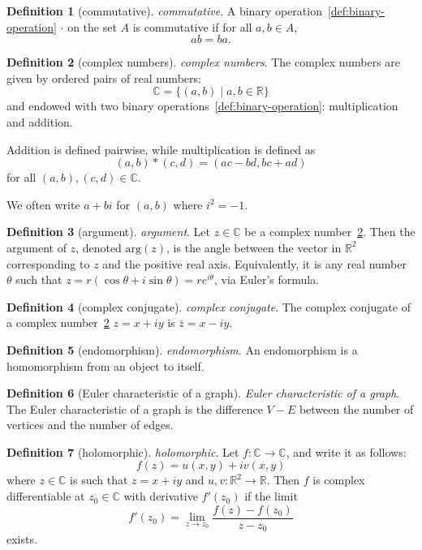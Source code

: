 \documentclass[12pt,a4paper]{article}
\theoremstyle{definition}
\newtheorem{definition}{Definition}
\begin{document}
\begin{definition}[commutative]\label{def:commutative}
\emph{commutative}. A binary operation~\ref{def:binary-operation} $\cdot$ on the set $A$ is commutative if for all $a,b\in A$, $$ab = ba.$$
\end{definition}

\begin{definition}[complex numbers]\label{def:complex-numbers}
\emph{complex numbers}. The complex numbers are given by ordered pairs of real numbers: $$\mathbb C = \{(a,b)\mid a,b\in \mathbb R\}$$ and endowed with two binary operations~\ref{def:binary-operation}: multiplication and addition. 

Addition is defined pairwise, while multiplication is defined as $$(a,b)*(c,d) = (ac-bd,bc+ad)$$ for all $(a,b),(c,d) \in \mathbb C$. 

We often write $a+bi$ for $(a,b)$ where $i^2=-1$.
\end{definition}

\begin{definition}[argument]\label{def:argument}
\emph{argument}. Let $z\in \mathbb C$ be a complex number~\ref{def:complex-numbers}. Then the argument of $z$, denoted $\text{arg}(z)$, is the angle between the vector in $\mathbb R^2$ corresponding to $z$ and the positive real axis. Equivalently, it is any real number $\theta$ such that $z= r(\cos\theta+i\sin\theta) = re^{i\theta}$, via Euler's formula.
\end{definition}

\begin{definition}[complex conjugate]\label{def:complex-conjugate}
\emph{complex conjugate}. The complex conjugate of a complex number~\ref{def:complex-numbers} $z = x+iy$ is $\overline z = x-iy$.
\end{definition}

\begin{definition}[endomorphism]\label{def:endomorphism}
\emph{endomorphism}. An endomorphism is a homomorphism from an object to itself.
\end{definition}

\begin{definition}[Euler characteristic of a graph]\label{def:euler-characteristic-of-a-graph}
\emph{Euler characteristic of a graph}. The Euler characteristic of a graph is the difference $V-E$ between the number of vertices and the number of edges.
\end{definition}

\begin{definition}[holomorphic]\label{def:holomorphic}
\emph{holomorphic}. Let $f:\mathbb C\to\mathbb C$, and write it as follows: $$f(z) = u(x,y) + iv(x,y)$$ where $z\in \mathbb C$ is such that $z = x+iy$ and $u,v:\mathbb R^2\to \mathbb R$. Then $f$ is complex differentiable at $z_0\in \mathbb C$ with derivative $f'(z_0)$ if the limit $$f'(z_0) = \lim_{z\to z_0} \frac{f(z)-f(z_0)}{z-z_0}$$ exists.
\end{definition}
\end{document}
